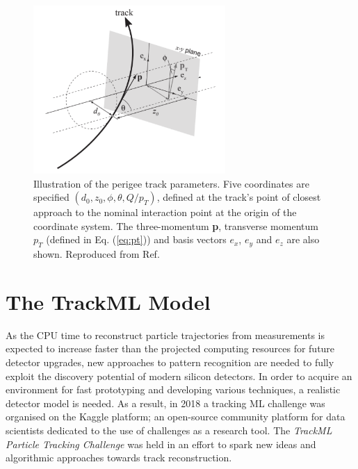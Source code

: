 \begin{figure}[!htbp]
  \centering
  \includegraphics[width=0.65\textwidth]{images/3-track-reconstruction/track_params.pdf}
  \caption{Illustration of the perigee track parameters. Five coordinates are specified $(d_0, z_0, \phi, \theta, Q/p_T)$, defined at the track’s point of closest approach to the nominal interaction point at the origin of the coordinate system. The three-momentum \textbf{p}, transverse momentum $p_T$ (defined in Eq. (\ref{eq:pt})) and basis vectors $e_x$, $e_y$ and $e_z$ are also shown. Reproduced from Ref. \cite{atlastrackingdocs}
  }
  \label{fig:track-parameters-perigee}
\end{figure}


\section{The TrackML Model}
\label{trackml-detector}

As the CPU time to reconstruct particle trajectories from measurements is expected to increase faster than the projected computing resources for future detector upgrades, new approaches to pattern recognition are needed to fully exploit the discovery potential of modern silicon detectors. In order to acquire an environment for fast prototyping and developing various techniques, a realistic detector model is needed. As a result, in 2018 a tracking ML challenge was organised on the Kaggle platform; an open-source community platform for data scientists dedicated to the use of challenges as a research tool. The \textit{TrackML Particle Tracking Challenge} \cite{kaggle-trackml} was held in an effort to spark new ideas and algorithmic approaches towards track reconstruction.

